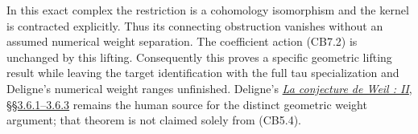 In this exact complex the restriction is a cohomology isomorphism and
the kernel is contracted explicitly. Thus its connecting obstruction
vanishes without an assumed numerical weight separation. The coefficient
action (CB7.2) is unchanged by this lifting. Consequently this proves a
specific geometric lifting result while leaving the target
identification with the full tau specialization and Deligne's numerical
weight ranges unfinished. Deligne's
\href{https://www.numdam.org/item/PMIHES_1980__52__137_0/}{\emph{La
conjecture de Weil : II}, §§3.6.1--3.6.3} remains the human source for
the distinct geometric weight argument; that theorem is not claimed
solely from (CB5.4).
